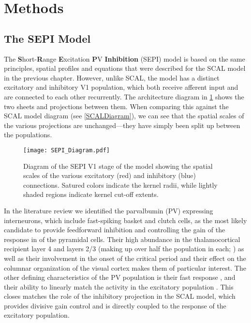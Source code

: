\section{Methods}

\subsection{The SEPI Model}

The \textbf{S}hort-\textbf{R}ange \textbf{E}xcitation \textbf{P}V
\textbf{Inhibition} (SEPI) model is based on the same principles,
spatial profiles and equations that were described for the SCAL model
in the previous chapter. However, unlike SCAL, the model has a distinct
excitatory and inhibitory V1 population, which both receive afferent
input and are connected to each other recurrently. The architecture
diagram in \ref{SEPIDiagram} shows the two sheets and projections
between them. When comparing this against the SCAL model diagram (see
\ref{SCALDiagram}), we can see that the spatial scales of the various
projections are unchanged---they have simply been split up between the
populations.

\begin{figure}
	\centering
        \texttt{[image: SEPI\_Diagram.pdf]}
	\caption{Diagram of the SEPI V1 stage of the model showing the
          spatial scales of the various excitatory (red) and
          inhibitory (blue) connections. Satured colors indicate the
          kernel radii, while lightly shaded regions indicate kernel
          cut-off extents.}
	\label{SEPIDiagram}
\end{figure}

In the literature review we identified the parvalbumin (PV) expressing
interneurons, which include fast-spiking basket and clutch cells, as
the most likely candidate to provide feedforward inhibition and
controlling the gain of the response in of the pyramidal cells. Their
high abundance in the thalamocortical recipient layer 4 and layers 2/3
(making up over half the population in each; \citealt{VanBrederode1990}) as
well as their involvement in the onset of the critical period
\citep{Fagiolini2000} and their effect on the columnar organization of the
visual cortex \citep{Hensch2004} makes them of particular interest. The
other defining characteristics of the PV population is their fast
response \citep{Cruikshank2007,Gabernet2005}, and their ability to
linearly match the activity in the excitatory population
\citep{Atallah2012}. This closes matches the role of the inhibitory
projection in the SCAL model, which provides divisive gain control and
is directly coupled to the response of the excitatory population.

